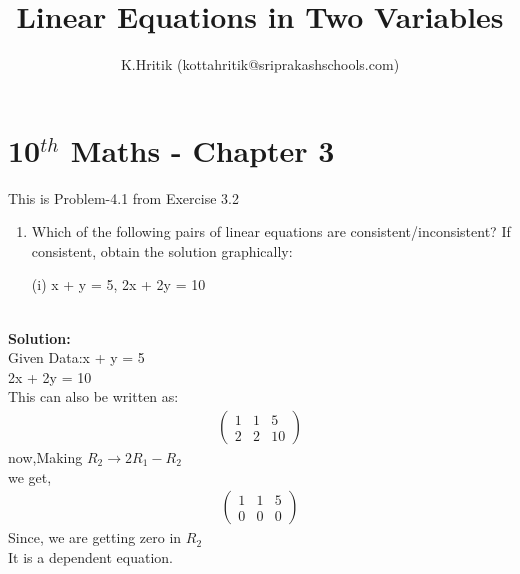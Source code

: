 \documentclass[12pt]{article}
\title{Linear Equations in Two Variables}
\author{K.Hritik (kottahritik@sriprakashschools.com)}
\newcommand{\myvec}[1]{\ensuremath{\begin{pmatrix}#1\end{pmatrix}}}
\newcommand{\solution}{\noindent \textbf{Solution: }}
\begin{document}
\maketitle
\section*{10$^{th}$ Maths - Chapter 3}
This is Problem-4.1 from Exercise 3.2
\begin{enumerate}
\item  Which of the following pairs of linear equations are consistent/inconsistent? If consistent, obtain the solution graphically:

(i) x + y = 5, 2x + 2y = 10 \\\\
\end{enumerate}
\solution \\
Given Data:x + y = 5\\ 
           2x + 2y = 10\\

This can also be written as:
\begin{align}
\myvec{1&1&5\\2&2&10}
\end{align}
now,Making $R_2 \xrightarrow\ 2R_1 - R_2$\\ 
we get,
\begin{align}
\myvec{1&1&5\\0&0&0}
\end{align}
Since, we are getting zero in $R_2$\\
It is a dependent equation.
\end{document}
